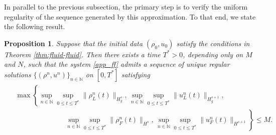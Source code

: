 \documentclass[10pt, reqno]{amsart}
\newtheorem{proposition}[theorem]{Proposition}
\theoremstyle{definition}
\theoremstyle{remark}
\numberwithin{equation}{section}
\newcommand{\N}{\mathbb{N}}
\begin{document}
In parallel to the previous subsection, the primary step is to verify the uniform regularity of the sequence generated by this approximation. To that end, we state the following result.
    \begin{proposition} Suppose that the initial data $(\rho_0, u_0)$ satisfy the conditions in Theorem \ref{thm:fluid-fluid}. Then there exists a time $T^*>0$, depending only on $M$ and $N$, such that the system \eqref{app_ff} admits a sequence of unique regular solutions $\{ (\rho^n, u^n)\}_{n\in\mathbb{N}}$ on $[0,T^*]$ satisfying
\begin{align}\label{uni_app}
\begin{aligned}
&\max\left\{\sup_{n\in\N}\sup_{0\le t\le T^*} \|\rho_L^n(t)\|_{H^s_g}, \, \sup_{n\in\N}\sup_{0\le t\le T^*} \|u_L^n(t)\|_{H^{s+1}_g}, \right. \\
&\hspace{3cm} \left. \sup_{n\in\N}\sup_{0\le t\le T^*} \|\rho_F^n(t)\|_{H^s}, \, \sup_{n\in\N}\sup_{0\le t\le T^*} \|u_F^n(t)\|_{H^{s+1}} \right\} \leq M.
\end{aligned}
\end{align}
    \end{proposition}
\end{document}
